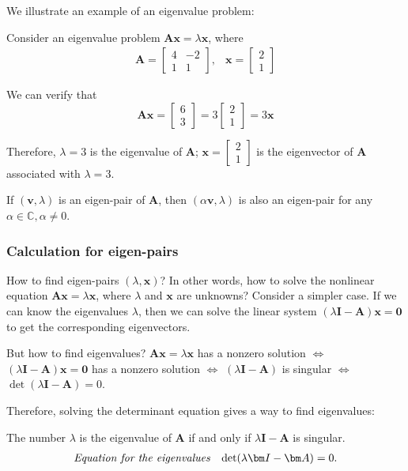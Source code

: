 We illustrate an example of an eigenvalue problem:
\begin{example}
Consider an eigenvalue problem $\bm{Ax}=\lambda\bm x$, where
\[
\begin{array}{ll}
\bm A=\begin{bmatrix}
4&-2\\1&1
\end{bmatrix},
&
\bm x=\begin{bmatrix}
2\\1
\end{bmatrix}
\end{array}
\]

We can verify that
\[
\bm{Ax}=\begin{bmatrix}
6\\3
\end{bmatrix}=3\begin{bmatrix}
2\\1
\end{bmatrix}=3\bm x
\]

Therefore, $\lambda=3$ is the eigenvalue of $\bm A$; $\bm x=\begin{bmatrix}
2\\1
\end{bmatrix}$ is the eigenvector of $\bm A$ associated with $\lambda=3.$
\end{example}
\begin{proposition}
If $(\bm v,\lambda)$ is an eigen-pair of $\bm A$, then $(\alpha\bm v,\lambda)$ is also an eigen-pair for any $\alpha\in\mathbb{C},\alpha\ne0$.
\end{proposition}

\subsubsection{Calculation for eigen-pairs}
How to find eigen-pairs $(\lambda,\bm x)$? In other words, how to solve the nonlinear equation $\bm{Ax}=\lambda\bm x$, where $\lambda$ and $\bm x$ are unknowns? Consider a simpler case. If we can know the eigenvalues $\lambda$, then we can solve the linear system $(\lambda\bm I-\bm A)\bm x=\bm 0$ to get the corresponding eigenvectors.

But how to find eigenvalues? $\bm{Ax}=\lambda\bm x$ has a nonzero solution $\Longleftrightarrow$$(\lambda\bm I-\bm A)\bm x=\bm 0$ has a nonzero solution $\Longleftrightarrow$ $(\lambda\bm I-\bm A)$ is singular $\Longleftrightarrow$$\det(\lambda\bm I-\bm A)=0.$

Therefore, solving the determinant equation gives a way to find eigenvalues:
\begin{proposition}
The number $\lambda$ is the eigenvalue of $\bm A$ if and only if $\lambda\bm I-\bm A$ is singular.
\begin{equation}
\begin{array}{ll}
\mbox{\emph{Equation for the eigenvalues}}
&
\det(\lambda\bm I-\bm A)=0.
\end{array}
\end{equation}
\end{proposition}


